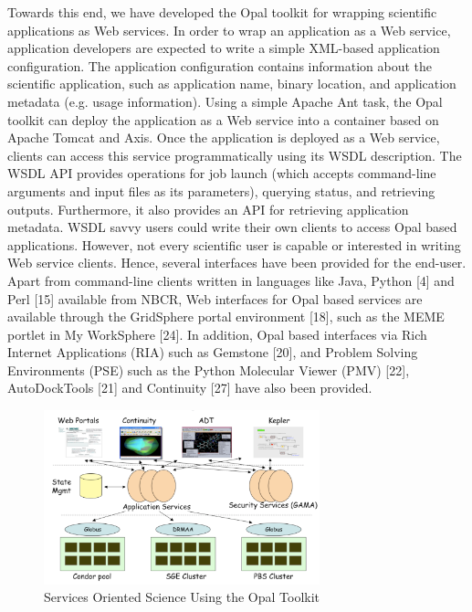 \documentclass[conference]{IEEEtran}
\begin{document}
Towards this end, we have developed the Opal toolkit
\cite{opal} for wrapping scientific applications as Web services. In order
to wrap an application as a Web service, application developers are
expected to write a simple XML-based application configuration. The
application configuration contains information about the scientific
application, such as application name, binary location, and application
metadata (e.g. usage information). Using a simple Apache Ant task, the Opal
toolkit can deploy the application as a Web service into a container based
on Apache Tomcat and Axis. Once the application is deployed as a Web
service, clients can access this service programmatically using its WSDL
description. The WSDL API provides operations for job launch (which accepts
command-line arguments and input files as its parameters), querying status,
and retrieving outputs. Furthermore, it also provides an API for retrieving
application metadata. WSDL savvy users could write their own clients to
access Opal based applications. However, not every scientific user is
capable or interested in writing Web service clients. Hence, several
interfaces have been provided for the end-user. Apart from command-line
clients written in languages like Java, Python [4] and Perl [15] available
from NBCR, Web interfaces for Opal based services are available through the
GridSphere portal environment [18], such as the MEME portlet in My
WorkSphere [24]. In addition, Opal based interfaces via Rich Internet
Applications (RIA) such as Gemstone [20], and Problem Solving Environments
(PSE) such as the Python Molecular Viewer (PMV) [22], AutoDockTools [21]
and Continuity [27] have also been provided.

\begin{figure}
\begin{center}
\includegraphics[width=8cm]{architecture}
\end{center}
\caption{Services Oriented Science Using the Opal Toolkit}
\label{fig:arch}
\end{figure}
\end{document}
